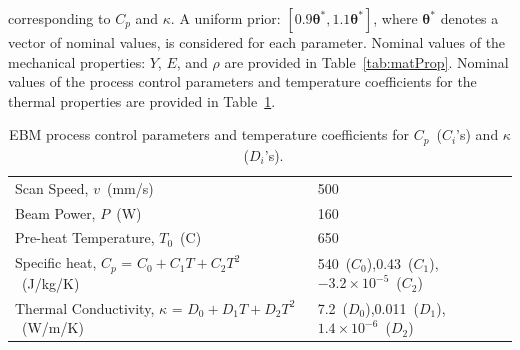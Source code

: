 corresponding to $C_p$ and $\kappa$. A uniform prior: $[0.9\bm{\theta}^\ast, 1.1\bm{\theta}^\ast]$, 
where $\bm{\theta}^\ast$ denotes a vector of nominal values,
is considered for each parameter. Nominal values of the mechanical properties: $Y$, $E$, and $\rho$ are provided
in Table~\ref{tab:matProp}. Nominal values of the process control parameters and temperature coefficients for
the thermal properties are provided in Table~\ref{tab:remain}.
%
\begin{table}[htbp]
\centering
\caption{EBM process control parameters and temperature coefficients for $C_p$~($C_i$'s) and $\kappa$~($D_i$'s).}
\label{tab:remain}
\vspace{1mm}
\begin{tabular}{ ll }
\toprule
Scan Speed, $v$~(mm/s) & 500 \\
Beam Power, $P$~(W) & 160 \\
Pre-heat Temperature, $T_0$~(C) & 650 \\
Specific heat, $C_p$ = $C_0+C_1T+C_2T^2$~(J/kg/K) & 540~($C_0$),0.43~($C_1$),$-3.2\times 10^{-5}$~($C_2$) \\
Thermal Conductivity, $\kappa$ = $D_0+D_1T+D_2T^2$~(W/m/K) & 7.2~($D_0$),0.011~($D_1$),$1.4\times 10^{-6}$~($D_2$) \\
\bottomrule
\end{tabular}
\end{table}

